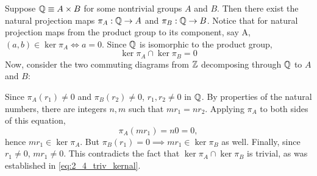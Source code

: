 \documentclass[12pt]{article}
\begin{document}
Suppose $\Q \equiv A \times B$ for some nontrivial groups $A$ and $B$. 
Then there exist the natural projection maps $\pi_A:\mathbb{Q} \rightarrow A$ and $\pi_B: \mathbb{Q} \rightarrow B$. 
Notice that for natural projection maps from the product group to its component, say A, $(a, b) \in \ker \pi_{A} \iff a = 0$. 
Since $\mathbb{Q}$ is isomorphic to the product group, 
\begin{equation} \label{eq:2_4_triv_kernal}
  \ker \pi_A \cap \ker \pi_B = 0 
\end{equation}
Now, consider the two commuting diagrams from $\mathbb{Z}$ decomposing through $\mathbb{Q}$ to $A$ and $B$: 
\begin{center}
\end{center}
Since $\pi_{A}(r_1) \neq 0$ and $\pi_{B}(r_2) \neq 0$, $r_1, r_2 \neq 0$ in $\mathbb{Q}$.
By properties of the natural numbers, there are integers $n, m$ such that $mr_1 = nr_2$. 
Applying $\pi_A$ to both sides of this equation, 
$$\pi_{A}(mr_1) = n0 = 0,$$
hence $mr_1 \in \ker \pi_A$. 
But $\pi_{B}(r_1) = 0 \implies mr_1 \in \ker\pi_{B}$ as well. 
Finally, since $r_1 \neq 0$, $mr_1 \neq 0$. 
This contradicts the fact that $\ker\pi_{A} \cap \ker\pi_{B}$ is trivial, as was established in \eqref{eq:2_4_triv_kernal}. 
\end{document}
